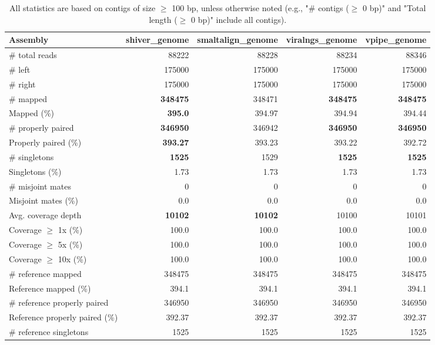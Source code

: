 \documentclass[12pt,a4paper]{article}
\begin{document}
\begin{table}[ht]
\begin{center}
\caption{All statistics are based on contigs of size $\geq$ 100 bp, unless otherwise noted (e.g., "\# contigs ($\geq$ 0 bp)" and "Total length ($\geq$ 0 bp)" include all contigs).}
\begin{tabular}{|l*{4}{|r}|}
\hline
Assembly & shiver\_genome & smaltalign\_genome & viralngs\_genome & vpipe\_genome \\ \hline
\# total reads & 88222 & 88228 & 88234 & 88346 \\ \hline
\# left & 175000 & 175000 & 175000 & 175000 \\ \hline
\# right & 175000 & 175000 & 175000 & 175000 \\ \hline
\# mapped & {\bf 348475} & 348471 & {\bf 348475} & {\bf 348475} \\ \hline
Mapped (\%) & {\bf 395.0} & 394.97 & 394.94 & 394.44 \\ \hline
\# properly paired & {\bf 346950} & 346942 & {\bf 346950} & {\bf 346950} \\ \hline
Properly paired (\%) & {\bf 393.27} & 393.23 & 393.22 & 392.72 \\ \hline
\# singletons & {\bf 1525} & 1529 & {\bf 1525} & {\bf 1525} \\ \hline
Singletons (\%) & 1.73 & 1.73 & 1.73 & 1.73 \\ \hline
\# misjoint mates & 0 & 0 & 0 & 0 \\ \hline
Misjoint mates (\%) & 0.0 & 0.0 & 0.0 & 0.0 \\ \hline
Avg. coverage depth & {\bf 10102} & {\bf 10102} & 10100 & 10101 \\ \hline
Coverage $\geq$ 1x (\%) & 100.0 & 100.0 & 100.0 & 100.0 \\ \hline
Coverage $\geq$ 5x (\%) & 100.0 & 100.0 & 100.0 & 100.0 \\ \hline
Coverage $\geq$ 10x (\%) & 100.0 & 100.0 & 100.0 & 100.0 \\ \hline
\# reference mapped & 348475 & 348475 & 348475 & 348475 \\ \hline
Reference mapped (\%) & 394.1 & 394.1 & 394.1 & 394.1 \\ \hline
\# reference properly paired & 346950 & 346950 & 346950 & 346950 \\ \hline
Reference properly paired (\%) & 392.37 & 392.37 & 392.37 & 392.37 \\ \hline
\# reference singletons & 1525 & 1525 & 1525 & 1525 \\ \hline

\end{tabular}
\end{center}
\end{table}
\end{document}

